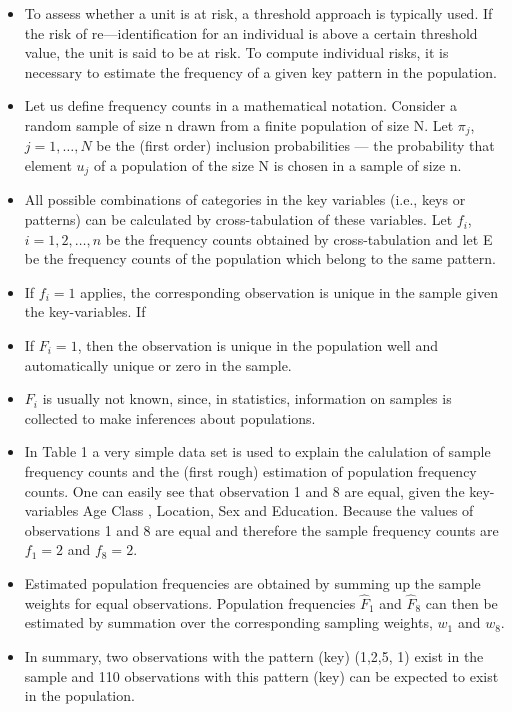 \documentclass[]{article}
\begin{document}
\begin{itemize}
\item To assess whether a unit is at risk, a threshold approach is typically used. If the
risk of re—identiﬁcation for an individual is above a certain threshold value, the unit
is said to be at risk. To compute individual risks, it is necessary to estimate the
frequency of a given key pattern in the population. 

\item Let us deﬁne frequency counts
in a mathematical notation. Consider a random sample of size n drawn from a
ﬁnite population of size N. Let $\pi_j$, $j = 1, \ldots ,N$ be the (ﬁrst order) inclusion
probabilities — the probability that element $u_j$ of a population of the size N is
chosen in a sample of size n.
\end{itemize}
\begin{itemize}
\item All possible combinations of categories in the key variables (i.e., keys or patterns)
can be calculated by cross-tabulation of these variables. Let $f_i$, $i=1,2,\ldots,n$ be
the frequency counts obtained by cross-tabulation and let E be the frequency
counts of the population which belong to the same pattern. 
\item If $f_i=1$ applies,
the corresponding observation is unique in the sample given the key-variables. If
\item If $F_i = 1$, then the observation is unique in the population  well and automatically
unique or zero in the sample.
\item $F_i$ is usually not known, since, in statistics, information on samples is collected
to make inferences about populations.
\end{itemize}
\newpage
\begin{itemize}
\item In Table 1 a very simple data set is used to explain the calulation of sample
frequency counts and the (first rough) estimation of population frequency counts.
One can easily see that observation 1 and 8 are equal, given the key-variables Age
Class , Location, Sex and Education. Because the values of observations 1 and
8 are equal and therefore the sample frequency counts are $f_1=2$ and $f_8=2$.

\item Estimated population frequencies are obtained by summing up the sample weights
for equal observations. Population frequencies $\hat{F}_1$ and $\hat{F}_8$ can then be estimated
by summation over the corresponding sampling weights, $w_1$ and $w_8$. 
\item In summary,
two observations with the pattern (key) (1,2,5, 1) exist in the sample and 110
observations with this pattern (key) can be expected to exist in the population.
\end{itemize}
\end{document}
